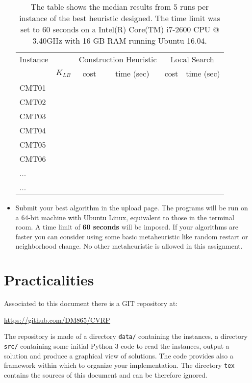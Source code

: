 \begin{itemize}
\begin{table}[tb]
\begin{center}
\begin{tabular}{|l||r|c|c|c|c|}
  \hline
Instance&
&\multicolumn{2}{c|}{Construction Heuristic} & \multicolumn{2}{c|}{Local Search}\\
& $K_{LB}$&cost&time (sec)&cost&time (sec)\\
  \hline
CMT01 &  &&&& \\
CMT02 &  &&&& \\
CMT03 &  &&&& \\
CMT04 &  &&&& \\
CMT05 &  &&&& \\
CMT06 &  &&&& \\
...   &  &&&& \\
...   &  &&&& \\
   \hline
\end{tabular}
\end{center}
\caption{\label{tabexample} The table shows the median results from 5 runs
  per instance of the best heuristic designed. The time limit was set to
  60 seconds on a Intel(R) Core(TM) i7-2600 CPU @ 3.40GHz with 16 GB RAM
  running Ubuntu 16.04.} 
\end{table}


\item Submit your best algorithm in the upload page. The programs will
  be run on a 64-bit machine with Ubuntu Linux, equivalent to those in
  the terminal room. A time limit of \textbf{60 seconds} will be
  imposed. If your algorithms are faster you can consider using some
  basic metaheuristic like random restart or neighborhood change. No
  other metaheuristic is allowed in this assignment.

\end{itemize}






\section*{Practicalities}

Associated to this document there is a GIT repository at:

\begin{center}
\url{https://github.com/DM865/CVRP}
\end{center}

The repository is made of a directory \verb!data/! containing the
instances, a directory \verb!src/! containing some initial Python 3 code
to read the instances, output a solution and produce a graphical view of
solutions. The code provides also a framework within which to organize
your implementation. The directory \verb!tex! contains the sources of
this document and can be therefore ignored.

